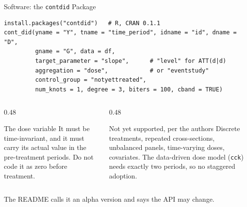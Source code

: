 \documentclass[main.tex]{subfiles}
\begin{document}
\begin{frame}[fragile]{Software: the \texttt{contdid} Package}


\begin{lstlisting}
install.packages("contdid")   # R, CRAN 0.1.1
cont_did(yname = "Y", tname = "time_period", idname = "id", dname = "D",
         gname = "G", data = df,
         target_parameter = "slope",      # "level" for ATT(d|d)
         aggregation = "dose",            # or "eventstudy"
         control_group = "notyettreated",
         num_knots = 1, degree = 3, biters = 100, cband = TRUE)
\end{lstlisting}

  \medskip
  \begin{columns}[T]
    \begin{column}{0.48\textwidth}
      \begin{block}{\footnotesize The dose variable}
        \footnotesize
        It must be time-invariant, and it must carry its actual value in the
        pre-treatment periods. Do not code it as zero before treatment.
      \end{block}
    \end{column}
    \begin{column}{0.48\textwidth}
      \begin{alertblock}{\footnotesize Not yet supported, per the authors}
        \footnotesize
        Discrete treatments, repeated cross-sections, unbalanced panels,
        time-varying doses, covariates. The data-driven dose model
        (\texttt{cck}) needs exactly two periods, so no staggered adoption.
      \end{alertblock}
    \end{column}
  \end{columns}

  \medskip
  \footnotesize The README calls it an alpha version and says the API may
  change.

\end{frame}
\end{document}
